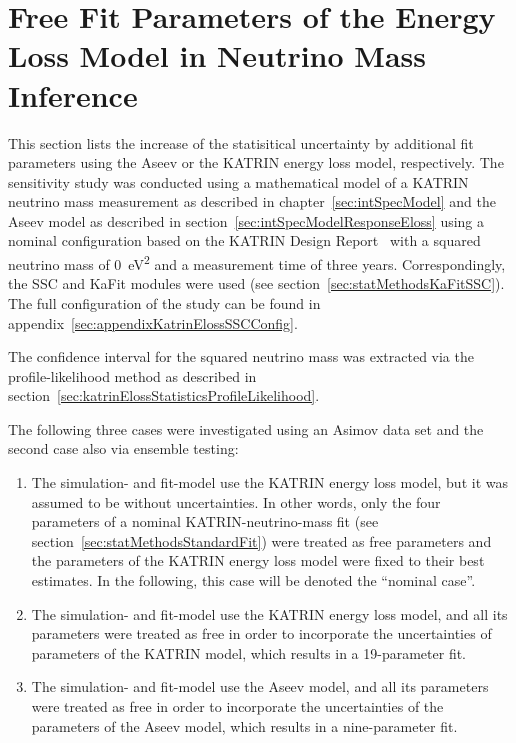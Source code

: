 \def\currentRootFolder{chapter/sensitivityStudyWithPreliminaryKatrinElossModel}
\def\currentFigureFolder{\currentRootFolder/fig}
\FloatBarrier
\section{Free Fit Parameters of the Energy Loss Model in Neutrino Mass Inference}
\label{sec:katrinElossModelResults}
This section lists the increase of the statisitical uncertainty by additional fit parameters using the Aseev or the KATRIN energy loss model, respectively.  The sensitivity study was conducted using a mathematical model of a KATRIN neutrino mass measurement as described in chapter~\ref{sec:intSpecModel} and the Aseev model as described in section~\ref{sec:intSpecModelResponseEloss} using a nominal configuration based on the KATRIN Design Report~\cite{Angrik:2005ep} with a squared neutrino mass of \SI{0}{eV^2} and a measurement time of three years. Correspondingly, the SSC and KaFit modules were used (see section~\ref{sec:statMethodsKaFitSSC}). The full configuration of the study can be found in appendix~\ref{sec:appendixKatrinElossSSCConfig}. 

The confidence interval for the squared neutrino mass was extracted via the profile-likelihood method as described in section~\ref{sec:katrinElossStatisticsProfileLikelihood}.

The following three cases were investigated using an Asimov data set and the second case also via ensemble testing:\mynobreakpar
\begin{enumerate}
	\item The simulation- and fit-model use the KATRIN energy loss model, but it was assumed to be without uncertainties. In other words, only the four parameters of a nominal KATRIN-neutrino-mass fit (see section~\ref{sec:statMethodsStandardFit}) were treated as free parameters and the parameters of the KATRIN energy loss model were fixed to their best estimates. In the following, this case will be denoted the ``nominal case''.
	\item The simulation- and fit-model use the KATRIN energy loss model, and all its parameters were treated as free in order to incorporate the uncertainties of parameters of the KATRIN model, which results in a 19-parameter fit.
	\item The simulation- and fit-model use the Aseev model, and all its parameters were treated as free in order to incorporate the uncertainties of the parameters of the Aseev model, which results in a nine-parameter fit.
\end{enumerate}

